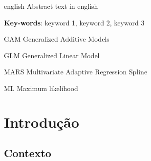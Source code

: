 \documentclass[
	12pt,				%
	openright,			%
	oneside,			%
	a4paper,			%
	english,			%
	brazil				%
	]{abntex2}
\begin{document}
\begin{resumo}[Abstract]
 \begin{otherlanguage*}{english}
    Abstract text in english
   
   \textbf{Key-words}: keyword 1, keyword 2, keyword 3
 \end{otherlanguage*}
\end{resumo}

\listoffigures*
\cleardoublepage

\listoftables*
\cleardoublepage

\begin{siglas}
  \item[GAM] Generalized Additive Models
  \item[GLM] Generalized Linear Model
  \item[MARS] Multivariate Adaptive Regression Spline
  \item[ML] Maximum likelihood
\end{siglas}

\tableofcontents*
\cleardoublepage

\textual
\chapter{Introdução}

\section{Contexto}
\end{document}
